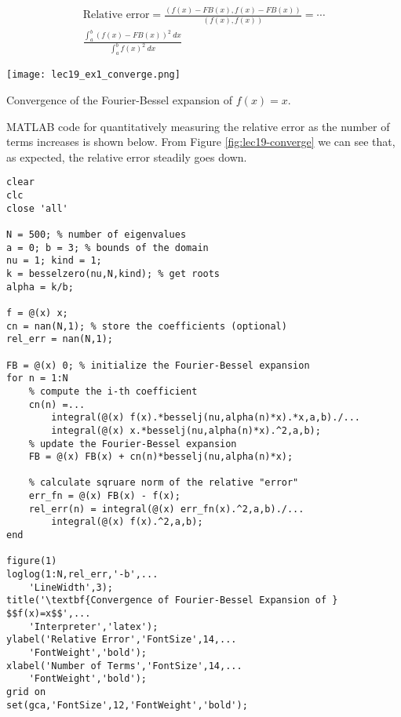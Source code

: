 \begin{multline}
\text{Relative error} = \frac{\left(f(x) - FB(x), f(x)-FB(x)\right)}{\left(f(x),f(x)\right)} = \cdots \\ \frac{\int_a^b \left(f(x)-FB(x)\right)^2 \ dx}{\int_a^b f(x)^2 \ dx}
\label{eq:lec19-rel-err}
\end{multline}
\begin{marginfigure}
\texttt{[image: lec19\_ex1\_converge.png]}
\caption{Convergence of the Fourier-Bessel expansion of $f(x)=x$.}
\label{fig:lec19-converge}
\end{marginfigure}
MATLAB code for quantitatively measuring the relative error as the number of terms increases is shown below.  From Figure \ref{fig:lec19-converge} we can see that, as expected, the relative error steadily goes down. 
\begin{lstlisting}[name=lec19-converge,style=myMatlab]
clear
clc
close 'all'

N = 500; % number of eigenvalues
a = 0; b = 3; % bounds of the domain
nu = 1; kind = 1;
k = besselzero(nu,N,kind); % get roots
alpha = k/b;

f = @(x) x; 
cn = nan(N,1); % store the coefficients (optional)
rel_err = nan(N,1); 

FB = @(x) 0; % initialize the Fourier-Bessel expansion
for n = 1:N
    % compute the i-th coefficient
    cn(n) =...
        integral(@(x) f(x).*besselj(nu,alpha(n)*x).*x,a,b)./...
        integral(@(x) x.*besselj(nu,alpha(n)*x).^2,a,b);
    % update the Fourier-Bessel expansion
    FB = @(x) FB(x) + cn(n)*besselj(nu,alpha(n)*x);

    % calculate sqruare norm of the relative "error"
    err_fn = @(x) FB(x) - f(x); 
    rel_err(n) = integral(@(x) err_fn(x).^2,a,b)./...
        integral(@(x) f(x).^2,a,b); 
end

figure(1)
loglog(1:N,rel_err,'-b',...
    'LineWidth',3);
title('\textbf{Convergence of Fourier-Bessel Expansion of } $$f(x)=x$$',...
    'Interpreter','latex');
ylabel('Relative Error','FontSize',14,...
    'FontWeight','bold');
xlabel('Number of Terms','FontSize',14,...
    'FontWeight','bold');
grid on
set(gca,'FontSize',12,'FontWeight','bold');
\end{lstlisting}


